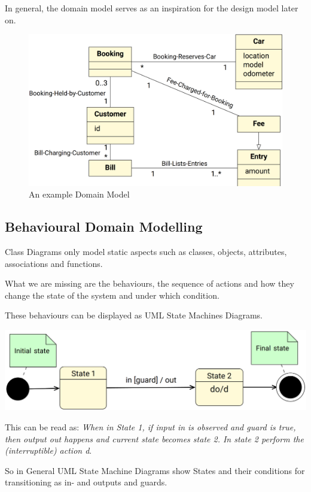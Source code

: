 \documentclass[
../../Software_Engineering_Summary.tex,
]
{subfiles}
\begin{document}
In general, the domain model serves as an inspiration for the design model later on.
\begin{figure}
    [htp]
    \centering
    \includegraphics[scale= 0.4]{Pics/04/DomainModelExample.png}
    \caption{An example Domain Model}
\end{figure}

\newpage
\subsection{Behavioural Domain Modelling}
Class Diagrams only model static aspects such as classes, objects, attributes, associations and functions. 

What we are missing are the behaviours, the sequence of actions and how they change the state of the system and under which condition.

These behaviours can be displayed as UML State Machines Diagrams.

\begin{defbox}
    \begin{center}
        \includegraphics[scale=0.5]{Pics/04/UMLStateMachineDiagrams.png}
    \end{center}
    This can be read as: \textit{When in State 1, if input in is observed and guard is true, then output out happens and current state becomes state 2. In state 2 perform the (interruptible) action d}.

    So in General UML State Machine Diagrams show States and their conditions for transitioning as in- and outputs and guards.
\end{defbox}
\end{document}
